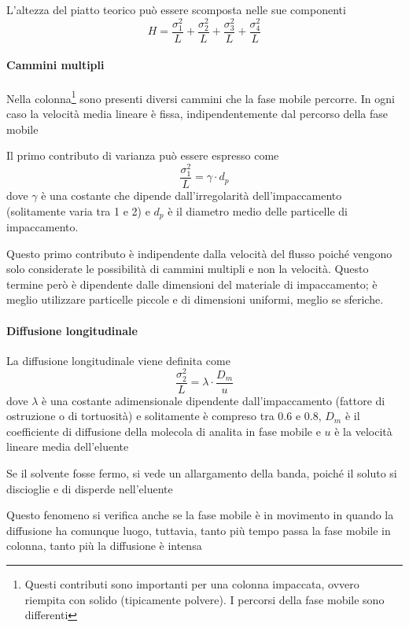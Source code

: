 L'altezza del piatto teorico può essere scomposta nelle sue componenti
\[
H = \frac{\sigma^2_1}{L} + \frac{\sigma^2_2}{L} + \frac{\sigma^2_3}{L} + \frac{\sigma^2_4}{L}
\]

\paragraph{Cammini multipli}
Nella colonna\footnote{Questi contributi sono importanti per una colonna impaccata, ovvero riempita con solido (tipicamente polvere).
I percorsi della fase mobile sono differenti} sono presenti diversi cammini che la fase mobile percorre.
In ogni caso la velocità media lineare è fissa, indipendentemente dal percorso della fase mobile

Il primo contributo di varianza può essere espresso come
\[
\frac{\sigma^2_1}{L} = \gamma \cdot d_p
\]
dove $\gamma$ è una costante che dipende dall'irregolarità dell'impaccamento (solitamente varia tra 1 e 2) e $d_p$ è il diametro medio delle particelle di impaccamento.


Questo primo contributo è indipendente dalla velocità del flusso poiché vengono solo considerate le possibilità di cammini multipli e non la velocità.
Questo termine però è dipendente dalle dimensioni del materiale di impaccamento; è meglio utilizzare particelle piccole e di dimensioni uniformi, meglio se sferiche.

\paragraph{Diffusione longitudinale} 
La diffusione longitudinale viene definita come
\[
\frac{\sigma^2_2}{L} = \lambda \cdot \frac{D_m}{u}
\]
dove $\lambda$ è una costante adimensionale dipendente dall'impaccamento (fattore di ostruzione o di tortuosità) e solitamente è compreso tra 0.6 e 0.8, $D_m$ è il coefficiente di diffusione della molecola di analita in fase mobile e $u$ è la velocità lineare media dell'eluente


Se il solvente fosse fermo, si vede un allargamento della banda, poiché il soluto si discioglie e di disperde nell'eluente


Questo fenomeno si verifica anche se la fase mobile è in movimento in quando la diffusione ha comunque luogo, tuttavia, tanto più tempo passa la fase mobile in colonna, tanto più la diffusione è intensa

